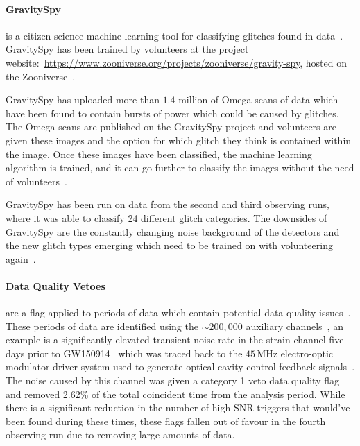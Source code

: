 \paragraph{GravitySpy}

is a citizen science machine learning tool for classifying glitches found in \gwadj data~\cite{gravityspy:2017}. GravitySpy has been trained by volunteers at the project website:~\href{https://www.zooniverse.org/projects/zooniverse/gravity-spy}{https://www.zooniverse.org/projects/zooniverse/gravity-spy}, hosted on the Zooniverse~\cite{zooniverse}.

GravitySpy has uploaded more than $1.4$ million of Omega scans of \gwadj data which have been found to contain bursts of power which could be caused by glitches. The Omega scans are published on the GravitySpy project and volunteers are given these images and the option for which glitch they think is contained within the image. Once these images have been classified, the machine learning algorithm is trained, and it can go further to classify the images without the need of volunteers~\cite{gravityspy:2021}.

GravitySpy has been run on data from the second and third observing runs, where it was able to classify 24 different glitch categories. The downsides of GravitySpy are the constantly changing noise background of the \gwadj detectors and the new glitch types emerging which need to be trained on with volunteering again~\cite{gravityspy:2023}.

\paragraph{Data Quality Vetoes} are a flag applied to periods of data which contain potential data quality issues~\cite{DQ_vetoes:2017}. These periods of data are identified using the ${\sim}200,000$ auxiliary channels~\cite{DQ_vetoes:2017}, an example is a significantly elevated transient noise rate in the strain channel five days prior to GW150914~\cite{GW150914:2016} which was traced back to the $45 \, \text{MHz}$ electro-optic modulator driver system used to generate optical cavity control feedback signals~\cite{aLIGO:2015}. The noise caused by this channel was given a category 1 veto data quality flag and removed 2.62\% of the total coincident time from the analysis period. While there is a significant reduction in the number of high SNR triggers that would've been found during these times, these flags fallen out of favour in the fourth observing run due to removing large amounts of data.
